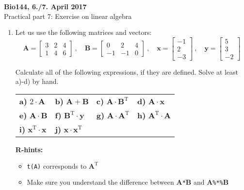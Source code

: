 \documentclass[a4paper,12pt]{scrartcl}
\def\T{\text{T}}
\begin{document}
\begin{center}
{\bf Bio144, 6./7. April 2017} \\[8mm] 
{\large Practical part 7: Exercise on linear algebra}\\[10mm]
\end{center}

 

\begin{enumerate}[\bf{1.}]
\item Let us use the following matrices and vectors:
\begin{equation*}
\mathbf{A}=\left[\begin{array}{ccc} 3 & 2 & 4 \\ 1 &4 & 6 \end{array}\right]\ , \quad
\mathbf{B} = \begin{bmatrix} 0 & 2 & 4 \\ -1 & -1 & 0\end{bmatrix}\ , \quad \bm{x}=\begin{bmatrix}-1 \\ 2 \\ -3 \end{bmatrix} \ , \quad \bm{y}=\begin{bmatrix}5 \\ 3 \\ -2 \end{bmatrix}
\end{equation*}

Calculate all of the following expressions, if they are defined. Solve at least a)-d) by hand.\\[2mm]
 

\begin{tabularx}{\columnwidth}{XXXl}%
 {\bf a)} $2\cdot \mathbf{A}$  & {\bf b)} $\mathbf{A}+\mathbf{B}$  & {\bf c)} $\mathbf{A}\cdot\mathbf{B}^\T$ & {\bf d)} $\mathbf{A}\cdot\bm{x}$\\[2mm]
 {\bf e)} $\mathbf{A}\cdot \mathbf{B}$ & {\bf f)} $\mathbf{B}^\T \cdot \bm{y}$ & {\bf g)} $\mathbf{A}\cdot \mathbf{A}^\T$ & {\bf h)}  $\mathbf{A}^\T\cdot \mathbf{A}$ \\[2mm]
 {\bf i)} $\bm{x}^\T\cdot\bm{x}$ &  {\bf j)} $\bm{x}\cdot\bm{x}^\T$\\[8mm]
\end{tabularx}
{\bf R-hints:}
\begin{itemize}
\item \texttt{t(A)} corresponds to $\mathbf{A}^\T$
\item Make sure you understand the difference between $\mathbf{A}$\texttt{*}$\mathbf{B}$ and $\mathbf{A}$\texttt{\%*\%}$\mathbf{B}$
\end{itemize}
 

\end{enumerate}
 
\end{document}
